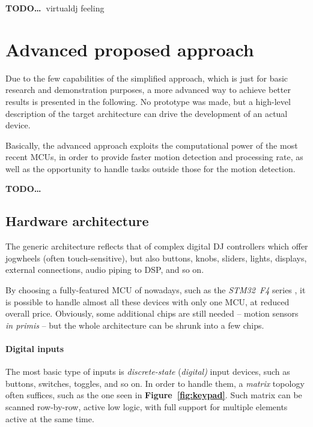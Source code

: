 \documentclass[a4paper,10pt]{article}
\newcommand{\TODO}{\textbf{TODO\dots\ }}
\newcommand{\citef}[1]{\textbf{Figure~\ref{#1}}}
\begin{document}
\begin{multicols}{2}
\TODO virtualdj feeling


\section{Advanced proposed approach}
\label{sec:advanced_approach}

Due to the few capabilities of the simplified approach, which is just for
basic research and demonstration purposes, a more advanced way to achieve
better results is presented in the following. No prototype was made, but a
high-level description of the target architecture can drive the development
of an actual device.

Basically, the advanced approach exploits the computational power of the most
recent MCUs, in order to provide faster motion detection and processing rate,
as well as the opportunity to handle tasks outside those for the motion
detection.

\TODO


\subsection{Hardware architecture}

The generic architecture reflects that of complex digital DJ controllers
which offer jogwheels (often touch-sensitive), but also buttons, knobs,
sliders, lights, displays, external connections, audio piping to DSP, and so
on.

By choosing a fully-featured MCU of nowadays, such as the \emph{STM32~F4}
series \cite{st_stm32f4}, it is possible to handle almost all these devices
with only one MCU, at reduced overall price. Obviously, some additional chips
are still needed -- motion sensors \emph{in primis} -- but the whole
architecture can be shrunk into a few chips.


\paragraph{Digital inputs}
The most basic type of inputs is \emph{discrete-state} (\emph{digital)} input
devices, such as buttons, switches, toggles, and so on. In order to handle
them, a \emph{matrix} topology often suffices, such as the one seen in
\citef{fig:keypad}. Such matrix can be scanned row-by-row, active low logic,
with full support for multiple elements active at the same time.


\end{multicols}
\end{document}
